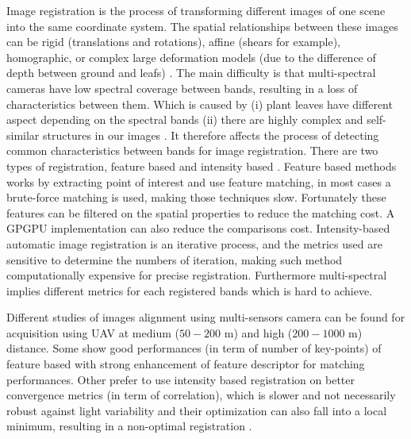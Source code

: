 \documentclass[../thesis.tex]{subfiles}
\begin{document}
	\par Image registration is the process of transforming different images of one scene into the same coordinate system.
	The spatial relationships between these images can be rigid (translations and rotations), affine (shears for example),
	homographic, or complex large deformation models (due to the difference of depth between ground and leafs) \cite{Kamoun}.
	The main difficulty is that multi-spectral cameras have low spectral coverage between bands, resulting in a loss of characteristics between them.
	Which is caused by (i) plant leaves have different aspect depending on the spectral bands
	(ii) there are highly complex and self-similar structures in our images \cite{douarre:hal-02183837}.
	It therefore affects the process of detecting common characteristics between bands for image registration.
	There are two types of registration, feature based and intensity based \cite{Zitova}.
	Feature based methods works by extracting point of interest and use feature matching, in most cases a brute-force matching is used, making those techniques slow.
	Fortunately these features can be filtered on the spatial properties to reduce the matching cost. A GPGPU implementation can also reduce the comparisons cost.
	Intensity-based automatic image registration is an iterative process, and the metrics used are sensitive to determine the numbers of iteration,
	making such method computationally expensive for precise registration. Furthermore multi-spectral implies different metrics for each registered bands which is hard to achieve.
	
	\par Different studies of images alignment using multi-sensors camera can be found for acquisition using UAV at medium ($50-200$ m) and high ($200-1000$ m) distance.
	Some show good performances (in term of number of key-points) of feature based \cite{DantasDiasJunior, Vakalopoulou}
	with strong enhancement of feature descriptor for matching performances.
	Other prefer to use intensity based registration \cite{douarre:hal-02183837} on better convergence metrics \cite{8118101} (in term of correlation),
	which is slower and not necessarily robust against light variability and their optimization can also fall into a local minimum,
	resulting in a non-optimal registration \cite{vioix2004}.
	
\end{document}
